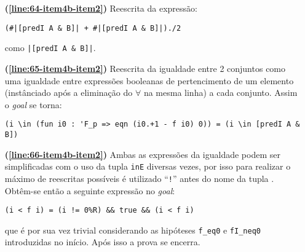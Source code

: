 \begin{enumerate}[label=\textbf{\roman*.}]
\begin{enumerate}[label=\textbf{\roman{enumi}.(\alph*)}]
\begin{enumerate}[label=\textbf{(\alph{enumii}.\arabic*)}]
\begin{enumerate}[listparindent=\parindent]
                                \item[\textbf{(\ref{line:64-item4b-item2})}] Reescrita da expressão:
                                        
                                        \begin{lstlisting}[language=coq,frame=single,tabsize=1]
(#|[predI A & B]| + #|[predI A & B]|)./2
                                        \end{lstlisting}
                                como \lstinline[language=coq]!|[predI A & B]|!.
                                
                                \item[\textbf{(\ref{line:65-item4b-item2})}] Reescrita da igualdade entre 2 conjuntos como uma igualdade entre expressões booleanas de pertencimento de um elemento (instânciado após a eliminação do $\forall$ na mesma linha) a cada conjunto. Assim o \textit{goal} se torna:
                                
                                        \begin{lstlisting}[language=coq,frame=single,tabsize=1]
(i \in (fun i0 : 'F_p => eqn (i0.+1 - f i0) 0)) = (i \in [predI A & B])
                                        \end{lstlisting}

                                \item[\textbf{(\ref{line:66-item4b-item2})}] Ambas as expressões da igualdade podem ser simplificadas com o uso da tupla \lstinline[language=coq]|inE| diversas vezes, por isso para realizar o máximo de reescritas possíveis é utilizado ``\lstinline[language=coq]|!|'' antes do nome da tupla \cite{assia_mahboubi_2022_7118596}. Obtêm-se então a seguinte expressão no \textit{goal}:
                                
                                        \begin{lstlisting}[language=coq,frame=single,tabsize=1]
(i < f i) = (i != 0%R) && true && (i < f i)
                                        \end{lstlisting}
                                que é por sua vez trivial considerando as hipóteses \lstinline[language=coq]|f_eq0| e \lstinline[language=coq]|fI_neq0| introduzidas no início. Após isso a prova se encerra.
                                
                        \end{enumerate}


\end{enumerate}
\end{enumerate}
\end{enumerate}
